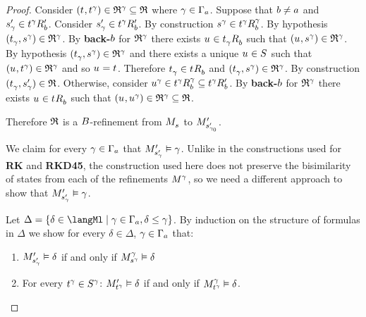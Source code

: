 \begin{proof}
Consider $(\kStateT, \kStateT[\gamma]) \in \refinement^\gamma \subseteq \refinement$ where $\gamma \in \Gamma_\agentA$.
Suppose that $\agentB \neq \agentA$ and $\kStateSP_\gamma \in \kSuccessorsPB{\kStateT[\gamma]}$.
Consider $\kStateSP_\gamma \in \kSuccessorsPB{\kStateT[\gamma]}$.
By construction $\kStateS[\gamma] \in \kSuccessorsB[\gamma]{\kStateT[\gamma]}$.
By hypothesis $(\kStateT_\gamma, \kStateS[\gamma]) \in \refinement^\gamma$.
By {\bf back-$\agentB$} for $\refinement^\gamma$ there exists $\kStateU \in \kSuccessorsB{\kStateT_\gamma}$ such that $(\kStateU, \kStateS[\gamma]) \in \refinement^\gamma$.
By hypothesis $(\kStateT_\gamma, \kStateS[\gamma]) \in \refinement^\gamma$ and there exists a unique $\kStateU \in \kStates$ such that $(\kStateU, \kStateT[\gamma]) \in \refinement^\gamma$ and so $\kStateU = \kStateT$.
Therefore $\kStateT_\gamma \in \kSuccessorsB{\kStateT}$ and $(\kStateT_\gamma, \kStateS[\gamma]) \in \refinement^\gamma$.
By construction $(\kStateT_\gamma, \kStateSP_\gamma) \in \refinement$.
Otherwise, consider $\kStateU[\gamma] \in \kSuccessorsB[\gamma]{\kStateT[\gamma]} \subseteq \kSuccessorsPB{\kStateT[\gamma]}$.
By {\bf back-$\agentB$} for $\refinement^\gamma$ there exists $\kStateU \in \kSuccessorsB{\kStateT}$ such that $(\kStateU, \kStateU[\gamma]) \in \refinement^\gamma \subseteq \refinement$.

Therefore $\refinement$ is a $\agentsB$-refinement from $\kPModel{\kStateS}$ to $\kPModelP{\kStateSP_{\gamma_0}}$.

We claim for every $\gamma \in \Gamma_\agentA$ that $\kPModelP{\kStateSP_\gamma} \entails \gamma$.
Unlike in the constructions used for {\bf RK} and {\bf RKD45}, the construction used here does not preserve the bisimilarity of states from each of the refinements $\kModel[\gamma]$, so we need a different approach to show that $\kPModelP{\kStateSP_\gamma} \entails \gamma$.

Let $\Delta = \{\delta \in \langMl \mid \gamma \in \Gamma_\agentA, \delta \leq \gamma\}$.
By induction on the structure of formulas in $\Delta$ we show for every $\delta \in \Delta$, $\gamma \in \Gamma_\agentA$ that:
\begin{enumerate}
    \item $\kPModelP{\kStateSP_\gamma} \entails \delta$ if and only if $\kPModel[\gamma]{\kStateS[\gamma]} \entails \delta$
    \item For every $\kStateT[\gamma] \in \kStates[\gamma]$: $\kPModelP{\kStateT[\gamma]} \entails \delta$ if and only if $\kPModel[\gamma]{\kStateT[\gamma]} \entails \delta$.
\end{enumerate}


\end{proof}
